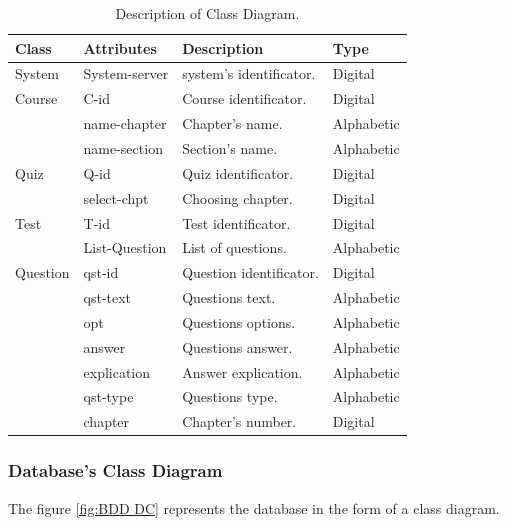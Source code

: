 \begin{table}[h!]
	\begin{center}
		\begin{tabular}{ |p{3cm}|p{3cm}|p{4cm}|p{2cm}|  }
 		\hline
 		Class & Attributes & Description & Type \\
 		\hline \hline
 		System & System-server & system's identificator. & Digital \\
 		\hline
 		Course & C-id & Course identificator. & Digital  \\
			& name-chapter & Chapter's name. & Alphabetic \\
			& name-section & Section's name. & Alphabetic \\
		\hline
		Quiz & Q-id & Quiz identificator. & Digital  \\
			& select-chpt & Choosing chapter. & Digital \\
		\hline
		Test & T-id & Test identificator. & Digital  \\
			& List-Question & List of questions. & Alphabetic \\
		\hline
		Question & qst-id & Question identificator. & Digital  \\
			& qst-text & Questions text. & Alphabetic \\
			& opt & Questions options. & Alphabetic \\
			& answer & Questions answer. & Alphabetic \\
			& explication & Answer explication. & Alphabetic \\

			& qst-type & Questions type. & Alphabetic \\
			& chapter & Chapter's number. & Digital \\
		\hline
\end{tabular}
\end{center}
\caption{Description of Class Diagram.}
\label{tab:DC}
\end{table}


\newpage

\subsubsection{Database's Class Diagram}

The figure \ref{fig:BDD DC} represents the database in the form of a class diagram.\\\\\\

